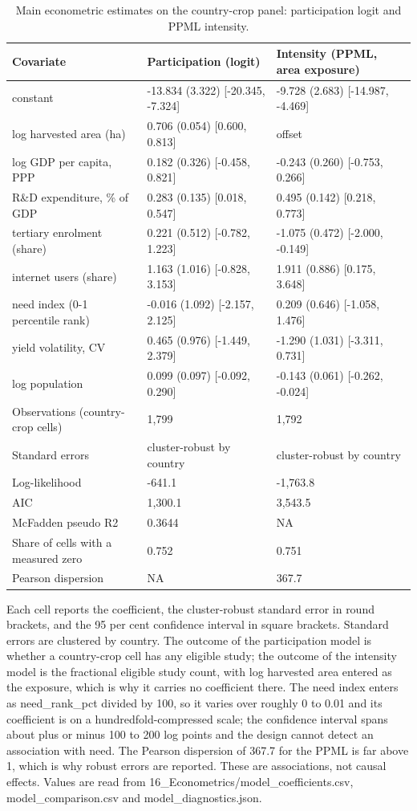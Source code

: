 \begin{table}[htbp]
\centering
\small
\caption{Main econometric estimates on the country-crop panel: participation logit and PPML intensity.}
\label{tab:tab_02_main_regression_estimates}
\begin{tabular}{lll}
\toprule
Covariate & Participation (logit) & Intensity (PPML, area exposure) \\
\midrule
constant & -13.834 (3.322) [-20.345, -7.324] & -9.728 (2.683) [-14.987, -4.469] \\
log harvested area (ha) & 0.706 (0.054) [0.600, 0.813] & offset \\
log GDP per capita, PPP & 0.182 (0.326) [-0.458, 0.821] & -0.243 (0.260) [-0.753, 0.266] \\
R\&D expenditure, \% of GDP & 0.283 (0.135) [0.018, 0.547] & 0.495 (0.142) [0.218, 0.773] \\
tertiary enrolment (share) & 0.221 (0.512) [-0.782, 1.223] & -1.075 (0.472) [-2.000, -0.149] \\
internet users (share) & 1.163 (1.016) [-0.828, 3.153] & 1.911 (0.886) [0.175, 3.648] \\
need index (0-1 percentile rank) & -0.016 (1.092) [-2.157, 2.125] & 0.209 (0.646) [-1.058, 1.476] \\
yield volatility, CV & 0.465 (0.976) [-1.449, 2.379] & -1.290 (1.031) [-3.311, 0.731] \\
log population & 0.099 (0.097) [-0.092, 0.290] & -0.143 (0.061) [-0.262, -0.024] \\
Observations (country-crop cells) & 1,799 & 1,792 \\
Standard errors & cluster-robust by country & cluster-robust by country \\
Log-likelihood & -641.1 & -1,763.8 \\
AIC & 1,300.1 & 3,543.5 \\
McFadden pseudo R2 & 0.3644 & NA \\
Share of cells with a measured zero & 0.752 & 0.751 \\
Pearson dispersion & NA & 367.7 \\
\bottomrule
\end{tabular}
\begin{minipage}{\linewidth}\footnotesize
Each cell reports the coefficient, the cluster-robust standard error in round brackets, and the 95 per cent confidence interval in square brackets. Standard errors are clustered by country. The outcome of the participation model is whether a country-crop cell has any eligible study; the outcome of the intensity model is the fractional eligible study count, with log harvested area entered as the exposure, which is why it carries no coefficient there. The need index enters as need\_rank\_pct divided by 100, so it varies over roughly 0 to 0.01 and its coefficient is on a hundredfold-compressed scale; the confidence interval spans about plus or minus 100 to 200 log points and the design cannot detect an association with need. The Pearson dispersion of 367.7 for the PPML is far above 1, which is why robust errors are reported. These are associations, not causal effects. Values are read from 16\_Econometrics/model\_coefficients.csv, model\_comparison.csv and model\_diagnostics.json.

\end{minipage}
\end{table}
